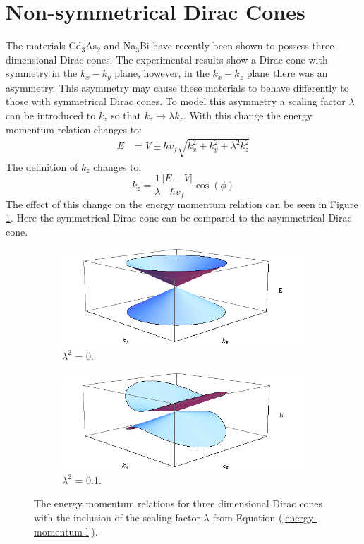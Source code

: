 		\section{Non-symmetrical Dirac Cones}
		\label{weyl - Non-symmetrical Dirac Cone}
		The materials Cd$_{3}$As$_{2}$ \cite{b34, b35} and Na$_{3}$Bi \cite{b29} have recently been shown to possess three dimensional Dirac cones. The experimental results show a Dirac cone with symmetry in the $k_{x}-k_{y}$ plane, however, in the $k_{x}-k_{z}$ plane there was an asymmetry. This asymmetry may cause these materials to behave differently to those with symmetrical Dirac cones. To model this asymmetry a scaling factor $\lambda$ can be introduced to $k_{z}$ so that $k_{z} \rightarrow \lambda k_{z}$. With this change the energy momentum relation changes to:
		\begin{align}
			E&=V\pm \hbar v_{f}\sqrt{k_{x}^{2}+k_{y}^{2}+\lambda^{2} k_{z}^{2}}
			\label{energy-momentum-l}
		\end{align}
		The definition of $k_{z}$ changes to:
		\begin{equation}
			k_{z}=\frac{1}{\lambda}\frac{|E-V|}{\hbar v_{f}}\cos(\phi)
			\label{kz-l}
		\end{equation}
		The effect of this change on the energy momentum relation can be seen in Figure \ref{cone}. Here the symmetrical Dirac cone can be compared to the asymmetrical Dirac cone.
		\begin{figure}[h]
			\begin{subfigure}[h]{0.5\textwidth}
				\centerline{\includegraphics[scale=0.4]{images/cone}}
				\caption{$\lambda^{2}$ = 0.}
			\end{subfigure}
			\hspace{0.5cm}
			\begin{subfigure}[h]{0.5\textwidth}
				\centerline{\includegraphics[scale=0.4]{images/cone-z}}
				\caption{$\lambda^{2}$ = 0.1.}
			\end{subfigure}
			\caption{The energy momentum relations for three dimensional Dirac cones with the inclusion of the scaling factor $\lambda$ from Equation (\ref{energy-momentum-l}).}
			\label{cone}
		\end{figure}	

